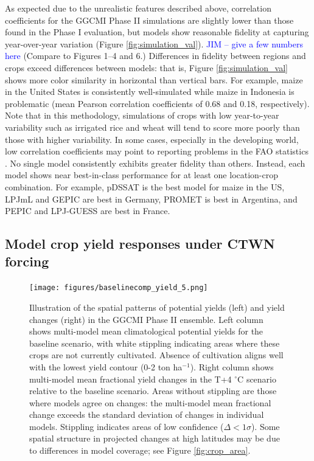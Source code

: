 \documentclass[gmd, manuscript]{copernicus} %
\begin{document}
As expected due to the unrealistic features described above, correlation coefficients for the GGCMI Phase II simulations are slightly lower than those found in the Phase I evaluation, but models show reasonable fidelity at capturing year-over-year variation (Figure \ref{fig:simulation_val}). 
\textcolor{blue}{JIM -- give a few numbers here}
(Compare to \citet{muller_global_2017} Figures 1--4 and 6.)  
Differences in fidelity between regions and crops exceed differences between models: 
that is, Figure \ref{fig:simulation_val} shows more color similarity in horizontal than vertical bars. 
For example, maize in the United States is consistently well-simulated while maize in Indonesia is problematic (mean Pearson correlation coefficients of 0.68 and 0.18, respectively). 
Note that in this methodology, simulations of crops with low year-to-year variability such as irrigated rice and wheat will tend to score more poorly than those with higher variability.
In some cases, especially in the developing world, low correlation coefficients may point to reporting problems in the FAO statistics \citep{Ray2012, muller_global_2017}. 
No single model consistently exhibits greater fidelity than others. 
Instead, each model shows near best-in-class performance for at least one location-crop combination. 
For example, pDSSAT is the best model for maize in the US, LPJmL and GEPIC are best in Germany, PROMET is best in Argentina, and PEPIC and LPJ-GUESS are best in France.


\subsection{Model crop yield responses under CTWN forcing}
\begin{figure}[ht]
\centering
   \texttt{[image: figures/baselinecomp\_yield\_5.png]} 
  \caption{
    Illustration of the spatial patterns of potential yields (left) and yield changes (right) in the GGCMI Phase II ensemble. 
    Left column shows multi-model mean climatological potential yields for the baseline scenario, with white stippling indicating areas where these crops are not currently cultivated. 
    Absence of cultivation aligns well with the lowest yield contour (0-2 ton ha$^{-1}$). 
    Right column shows multi-model mean fractional yield changes in the T+4 $^{\circ}$C scenario relative to the baseline scenario. 
    Areas without stippling are those where models agree on changes: the multi-model mean fractional change exceeds the standard deviation of changes in individual models. 
    Stippling indicates areas of low confidence ($\Delta < 1 \sigma$). 
    Some spatial structure in projected changes at high latitudes may be due to differences in model coverage; see Figure \ref{fig:crop_area}.
   }
   \label{fig:maizesoybaseline}
\end{figure}
\end{document}
